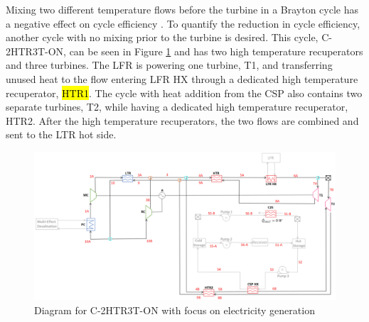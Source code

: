 \begin{paracol}{2}
Mixing two different temperature flows before the turbine in a Brayton cycle has a negative effect on cycle efficiency . To quantify the reduction in cycle efficiency, another cycle with no mixing prior to the turbine is desired. This cycle, C-2HTR3T-ON, can be seen in Figure \ref{c-2htr3t-on} and has two high temperature recuperators and three turbines. The LFR is powering one turbine, T1, and transferring unused heat to the flow entering LFR HX through a dedicated high temperature recuperator, \hl{HTR1}. 
The cycle with heat addition from the CSP also contains two separate turbines, T2, while having a dedicated high temperature recuperator, HTR2. 
After the high temperature recuperators, the two flows are combined and sent to the LTR hot side. 

\end{paracol}
\begin{figure}[H]
    \widefigure
    \includegraphics[width=\linewidth]{Definitions/c-2htr3t-on.pdf}
    \caption{Diagram for C-2HTR3T-ON with focus on electricity generation\label{c-2htr3t-on}}
\end{figure}
